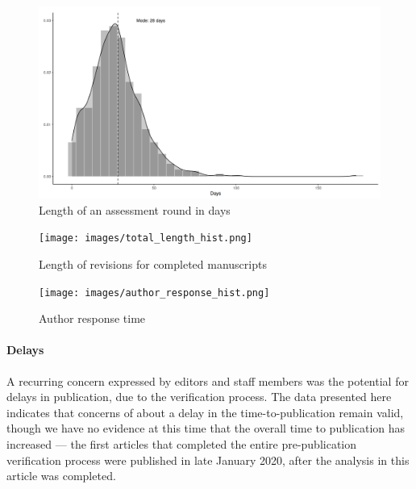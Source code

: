 \documentclass[PP]{AEA}
\begin{document}
\begin{figure}
    \centering
    \includegraphics[height=0.4\textheight]{images/revision_round_length_hist.png}
    \caption{Length of an assessment round in days}
    \label{fig:pre:round_length}
\end{figure}

\begin{figure}
    \centering
    \texttt{[image: images/total\_length\_hist.png]}
    \caption{Length of revisions for completed manuscripts}
    \label{fig:pre:revision_length}
\end{figure}




\begin{figure}
    \centering
    \texttt{[image: images/author\_response\_hist.png]}
    \caption{Author response time}
    \label{fig:pre:author_response_time}
\end{figure}



\paragraph{Delays} A recurring concern expressed by editors and staff members was the potential for   delays in publication, due to the verification process. The data presented here indicates that concerns of about a delay in the time-to-publication remain valid, though we have no evidence at this time that the overall time to publication has increased --- the first articles that completed the entire pre-publication verification process were published in late January 2020, after the analysis in this article was completed.
\end{document}
